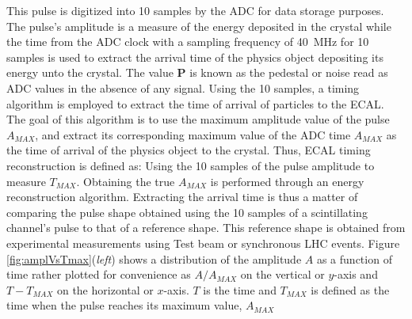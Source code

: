 This pulse is digitized into 10 samples by the ADC for data storage purposes. The pulse's amplitude  is a measure of the energy deposited in the crystal while the time from the ADC clock with a sampling frequency of 40~MHz for 10 samples is used to extract the arrival time of the physics object depositing its energy unto the crystal. The value \textbf{P} is known as the pedestal or noise read as ADC values in the absence of any signal. Using the 10 samples, a timing algorithm is employed to extract the time of arrival of particles to the ECAL. The goal of this algorithm is to use the maximum amplitude value of the pulse $A_{MAX}$, and extract its corresponding maximum value of the ADC time $A_{MAX}$ as the time of arrival of the physics object to the crystal. Thus, ECAL timing reconstruction is defined as: Using the 10 samples of the pulse amplitude to measure $T_{MAX}$. Obtaining the true $A_{MAX}$ is performed through an energy reconstruction algorithm. Extracting the arrival time is thus a matter of comparing the pulse shape obtained using the 10 samples of a scintillating channel's pulse to that of a reference shape.
This reference shape is obtained from experimental measurements using Test beam or synchronous LHC events. Figure \ref{fig:amplVsTmax}(\textit{left}) shows a distribution of the amplitude $A$ as a function of time rather plotted for convenience as $A/A_{MAX}$ on the vertical or $y$-axis and $T - T_{MAX}$ on the horizontal or $x$-axis. $T$ is the time and $T_{MAX}$ is defined as the time when the  pulse reaches its maximum value, $A_{MAX}$ 


